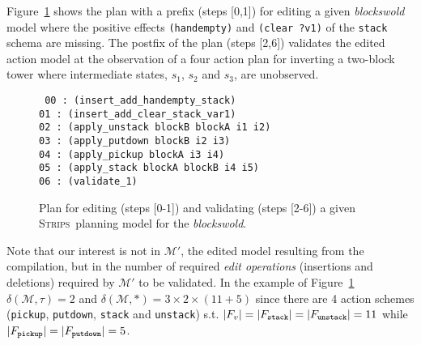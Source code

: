 \documentclass[letterpaper]{article} %
\newcommand{\strips}{\textsc{Strips}}     %
\begin{document}
Figure~\ref{fig:plan-pdistance} shows the plan with a prefix (steps [0,1]) for editing a given {\em blockswold} model where the positive effects {\tt\small (handempty)} and {\tt\small (clear ?v1)} of the {\tt\small stack} schema are missing. The postfix of the plan (steps [2,6]) validates the edited action model at the observation of a four action plan for inverting a two-block tower where intermediate states, $s_1$, $s_2$ and $s_3$, are unobserved. 
\begin{figure}
{\tt\scriptsize
00 : (insert\_add\_handempty\_stack)\\
01 : (insert\_add\_clear\_stack\_var1)\\
02 : (apply\_unstack blockB blockA i1 i2)\\
03 : (apply\_putdown blockB i2 i3)\\
04 : (apply\_pickup blockA i3 i4)\\
05 : (apply\_stack blockA blockB i4 i5)\\
06 : (validate\_1)
}
 \caption{\small Plan for editing (steps [0-1]) and validating (steps [2-6]) a given \strips\ planning model for the {\em blockswold}.}
\label{fig:plan-pdistance}
\end{figure}

Note that our interest is not in $\mathcal{M}'$, the edited model resulting from the compilation, but in the number of required {\em edit operations} (insertions and deletions) required by $\mathcal{M}'$ to be validated. In the example of Figure~\ref{fig:plan-pdistance} $\delta(\mathcal{M},\tau)=2$ and $\delta(\mathcal{M},*)=3\times 2\times (11+5)$ since there are 4 action schemes ({\small\tt pickup}, {\small\tt putdown}, {\small\tt stack} and {\small\tt unstack}) s.t. $|F_v|=|F_{\tt stack}|=|F_{\tt unstack}|=11$ while $|F_{\tt pickup}|=|F_{\tt putdown}|=5$. 
\end{document}
